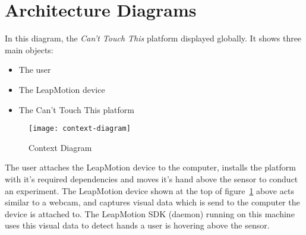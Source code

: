 \documentclass{standalone}
\begin{document}


  \section{Architecture Diagrams}
  In this diagram, the \textit{Can't Touch This} platform displayed globally.
  It shows three main objects:
  \begin{itemize}
    \tightlist{}
    \item The user
    \item The LeapMotion device
    \item The Can't Touch This platform
  \end{itemize}

  \begin{figure}[h]
    \centering
      \texttt{[image: context-diagram]}
    \caption{Context Diagram}
    \label{fig:context-diagram}
  \end{figure}

  The user attaches the LeapMotion device to the computer, installs the platform
  with it's required dependencies and moves it's hand above the sensor to conduct
  an experiment. The LeapMotion device shown at the top of
  figure~\ref{fig:context-diagram} above
  acts similar to a webcam, and captures visual data which is send to the
  computer the device is attached to. The LeapMotion SDK (daemon) running on this
  machine uses this visual data to detect hands a user is hovering above the
  sensor.
\end{document}
